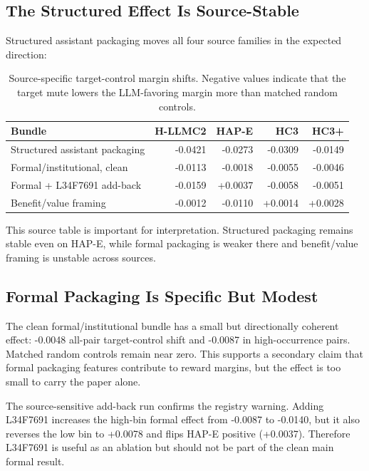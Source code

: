 \documentclass[11pt]{article}
\begin{document}
\subsection{The Structured Effect Is Source-Stable}

Structured assistant packaging moves all four source families in the expected
direction:

\begin{table}[h]
\centering
\small
\begin{tabular}{lrrrr}
\toprule
Bundle & H-LLMC2 & HAP-E & HC3 & HC3+ \\
\midrule
Structured assistant packaging & -0.0421 & -0.0273 & -0.0309 & -0.0149 \\
Formal/institutional, clean & -0.0113 & -0.0018 & -0.0055 & -0.0046 \\
Formal + L34F7691 add-back & -0.0159 & +0.0037 & -0.0058 & -0.0051 \\
Benefit/value framing & -0.0012 & -0.0110 & +0.0014 & +0.0028 \\
\bottomrule
\end{tabular}
\caption{Source-specific target-control margin shifts. Negative values indicate
that the target mute lowers the LLM-favoring margin more than matched random
controls.}
\label{tab:source-effects}
\end{table}

This source table is important for interpretation. Structured packaging remains
stable even on HAP-E, while formal packaging is weaker there and benefit/value
framing is unstable across sources.

\subsection{Formal Packaging Is Specific But Modest}

The clean formal/institutional bundle has a small but directionally coherent
effect: -0.0048 all-pair target-control shift and -0.0087 in high-occurrence
pairs. Matched random controls remain near zero. This supports a secondary
claim that formal packaging features contribute to reward margins, but the
effect is too small to carry the paper alone.

The source-sensitive add-back run confirms the registry warning. Adding
L34F7691 increases the high-bin formal effect from -0.0087 to -0.0140, but it
also reverses the low bin to +0.0078 and flips HAP-E positive (+0.0037).
Therefore L34F7691 is useful as an ablation but should not be part of the clean
main formal result.
\end{document}
